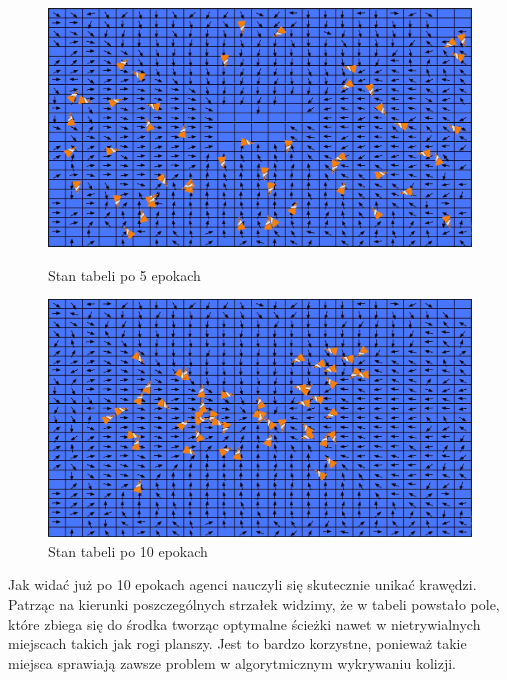 \documentclass{article}
\begin{document}
\begin{figure}[H]
    \begin{minipage}[h]{0.48\textwidth}
        \centering
        \includegraphics[width=\textwidth]{4_Qtable_after_5rd_epoch.jpg}
        \caption{Stan tabeli po 5 epokach}
    \end{minipage}
    \hspace{0.02\textwidth}
    \begin{minipage}[h]{0.48\textwidth}
        \centering
        \includegraphics[width=\textwidth]{5_Qtable_after_10th_epoch.jpg}
        \caption{Stan tabeli po 10 epokach}
    \end{minipage}
\end{figure}

Jak widać już po 10 epokach agenci nauczyli się skutecznie unikać krawędzi. Patrząc na kierunki poszczególnych strzałek widzimy, że w tabeli powstało pole, które zbiega się do środka tworząc optymalne ścieżki nawet w nietrywialnych miejscach takich jak rogi planszy. Jest to bardzo korzystne, ponieważ takie miejsca sprawiają zawsze problem w algorytmicznym wykrywaniu kolizji.
\end{document}
